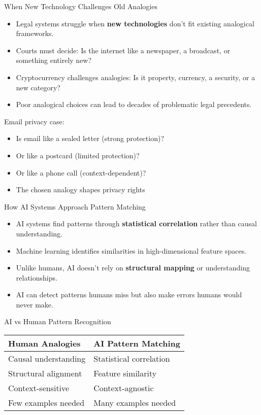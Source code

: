 \documentclass{beamer}
\begin{document}
	
	\begin{frame}{When New Technology Challenges Old Analogies}
		\begin{itemize}
			\item Legal systems struggle when \textbf{new technologies} don't fit existing analogical frameworks.
			\item Courts must decide: Is the internet like a newspaper, a broadcast, or something entirely new?
			\item Cryptocurrency challenges analogies: Is it property, currency, a security, or a new category?
			\item Poor analogical choices can lead to decades of problematic legal precedents.
		\end{itemize}
		
		\begin{example}
			Email privacy case:
			\begin{itemize}
				\item Is email like a sealed letter (strong protection)?
				\item Or like a postcard (limited protection)?
				\item Or like a phone call (context-dependent)?
				\item The chosen analogy shapes privacy rights
			\end{itemize}
		\end{example}
	\end{frame}
	
	\begin{frame}{How AI Systems Approach Pattern Matching}
		\begin{itemize}
			\item AI systems find patterns through \textbf{statistical correlation} rather than causal understanding.
			\item Machine learning identifies similarities in high-dimensional feature spaces.
			\item Unlike humans, AI doesn't rely on \textbf{structural mapping} or understanding relationships.
			\item AI can detect patterns humans miss but also make errors humans would never make.
		\end{itemize}
		
		\begin{block}{AI vs Human Pattern Recognition}
			\begin{tabular}{l|l}
				\textbf{Human Analogies} & \textbf{AI Pattern Matching} \\
				\hline
				Causal understanding & Statistical correlation \\
				Structural alignment & Feature similarity \\
				Context-sensitive & Context-agnostic \\
				Few examples needed & Many examples needed
			\end{tabular}
		\end{block}
	\end{frame}
	
\end{document}
